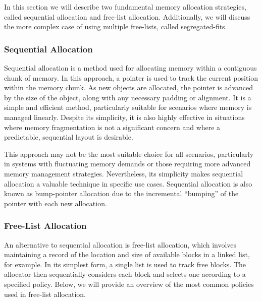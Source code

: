 
In this section we will describe two fundamental memory allocation strategies, called sequential allocation and free-list allocation. Additionally, we will discuss the more complex case of using multiple free-lists, called segregated-fits.

\subsubsection{Sequential Allocation}
\label{sec:seq_allocation}
\label{sec:bump_pointer}

Sequential allocation is a method used for allocating memory within a contiguous chunk of memory. In this approach, a pointer is used to track the current position within the memory chunk. As new objects are allocated, the pointer is advanced by the size of the object, along with any necessary padding or alignment. It is a simple and efficient method, particularly suitable for scenarios where memory is managed linearly. Despite its simplicity, it is also highly effective in situations where memory fragmentation is not a significant concern and where a predictable, sequential layout is desirable.

This approach may not be the most suitable choice for all scenarios, particularly in systems with fluctuating memory demands or those requiring more advanced memory management strategies. Nevertheless, its simplicity makes sequential allocation a valuable technique in specific use cases. Sequential allocation is also known as bump-pointer allocation due to the incremental ``bumping'' of the pointer with each new allocation. 

\subsubsection{Free-List Allocation}

An alternative to sequential allocation is free-list allocation, which involves maintaining a record of the location and size of available blocks in a linked list, for example. In its simplest form, a single list is used to track free blocks. The allocator then sequentially considers each block and selects one according to a specified policy. Below, we will provide an overview of the most common policies used in free-list allocation.

